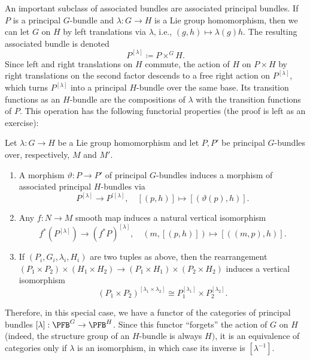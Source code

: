 An important subclass of associated bundles are associated principal bundles. If $P$ is a principal $G$-bundle and $\lambda:G\to H$ is a Lie group homomorphism, then we can let $G$ on $H$ by left translations via $\lambda$, i.e., $(g,h)\mapsto \lambda(g)h$. The resulting associated bundle is denoted
\[\boxed{P^{[\lambda]}\coloneqq P\times^G H.}\]
Since left and right translations on $H$ commute, the action of $H$ on $P\times H$ by right translations on the second factor descends to a free right action on $P^{[\lambda]}$, which turns $P^{[\lambda]}$ into a principal $H$-bundle over the same base. Its transition functions as an $H$-bundle are the compositions of $\lambda$ with the transition functions of $P$. This operation has the following functorial properties (the proof is left as an exercise):
\begin{prop}
    Let $\lambda:G\to H$ be a Lie group homomorphism and let $P,P'$ be principal $G$-bundles over, respectively, $M$ and $M'$.
    \begin{enumerate}
        \item A morphism $\vartheta:P\to P'$ of principal $G$-bundles induces a morphism of associated principal $H$-bundles via
        \[P^{[\lambda]}\to P^{\prime[\lambda]},\quad [(p,h)]\mapsto \left[\left(\vartheta(p),h\right)\right].\]
        \item Any $f:N\to M$ smooth map induces a natural vertical isomorphism
        \[f^\ast\left(P^{[\lambda]}\right)\to (f^\ast P)^{[\lambda]},\quad \left(m,[(p,h)]\right)\mapsto \left[\left((m,p),h\right)\right].\]
        \item If $(P_i,G_i,\lambda_i,H_i)$ are two tuples as above, then the rearrangement $(P_1\times P_2)\times(H_1\times H_2)\to (P_1\times H_1)\times(P_2\times H_2)$ induces a vertical isomorphism
        \[\left(P_1\times P_2\right)^{[\lambda_1\times\lambda_2]}\cong P_1^{[\lambda_1]}\times P_2^{[\lambda_2]}.\]
    \end{enumerate}
\end{prop}
Therefore, in this special case, we have a functor of the categories of principal bundles $[\lambda]:\PFB^G\to \PFB^H$. Since this functor ``forgets'' the action of $G$ on $H$ (indeed, the structure group of an $H$-bundle is always $H)$, it is an equivalence of categories only if $\lambda$ is an isomorphism, in which case its inverse is $[\lambda^{-1}]$.


